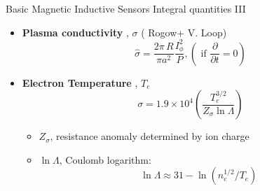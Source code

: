 \documentclass{beamer}
\begin{document}
\begin{frame}{Basic Magnetic Inductive Sensors } {Integral  quantities III}
   \begin{itemize}
	\item \textbf{ Plasma conductivity }, $\sigma$ ( Rogow+ V. Loop)
		$$ \hat{\sigma} =\frac{2 \pi\, R}{\pi a^2} \frac{I_\phi^2}{P}, (\textrm{ if } \frac{\partial}{\partial t} =0 ) $$
   	\item  \textbf{Electron Temperature }, $T_e$
	$$ \sigma = 1.9 \times 10^4 \left (\frac{T_e^{3/2}}{Z_\sigma \ln \Lambda } \right )  $$
	\begin{itemize}
		\item  $Z_\sigma$, resistance anomaly determined by ion charge
		\item  $\ln \Lambda  $, Coulomb logarithm:
		$$ \ln \Lambda  \approx 31 - \ln(n_e^{1/2} / T_e)$$
	\end{itemize}

     \end{itemize}
\end{frame}
\end{document}
